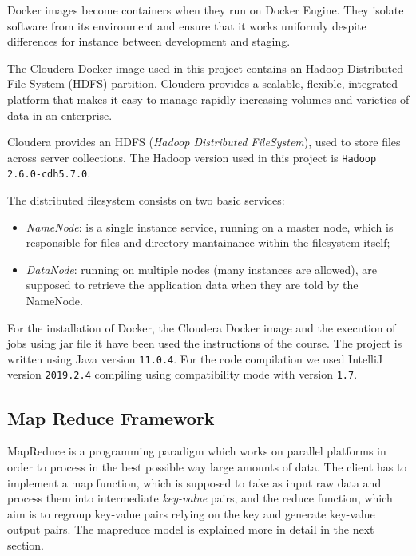\documentclass[a4paper,11pt, twoside, openright]{article}
\begin{document}
		\bigskip

		\noindent
		Docker images become containers when they run on Docker Engine. They isolate software from its environment and ensure that it works uniformly despite differences for instance between development and staging.
		
		\bigskip

		\noindent
		The Cloudera\parencite{Cloudera} Docker image used in this project contains an Hadoop Distributed File System (HDFS) partition. Cloudera provides a scalable, flexible, integrated platform that makes it easy to manage rapidly increasing volumes and varieties of data in an enterprise. 

		\bigskip
		
		\noindent
		Cloudera provides an HDFS (\textit{Hadoop Distributed FileSystem})\parencite{Hadoop-Mapreduce}, used to store files across server collections. The Hadoop version used in this project is \texttt{Hadoop 2.6.0-cdh5.7.0}.
		
		The distributed filesystem consists on two basic services: \begin{itemize}
			\item \textit{NameNode}: is a single instance service, running on a master node, which is responsible for files and directory mantainance within the filesystem itself;
			
			\item \textit{DataNode}: running on multiple nodes (many instances are allowed), are supposed to retrieve the application data when they are told by the NameNode.
		\end{itemize}
	
		\bigskip
		
		\noindent
		For the installation of Docker, the Cloudera Docker image and the execution of jobs using jar file it have been used the instructions of the course. The project is written using Java version \texttt{11.0.4}. For the code compilation we used IntelliJ version \texttt{2019.2.4} compiling using compatibility mode with version \texttt{1.7}.

	\subsection{Map Reduce Framework}
		MapReduce is a programming paradigm which works on parallel platforms in order to process in the best possible way large amounts of data. The client has to implement a map function, which is supposed to take as input raw data and process them into intermediate \textit{key-value} pairs, and the reduce function, which aim is to regroup key-value pairs relying on the key and generate key-value output pairs. The mapreduce model is explained more in detail in the next section.
		
\end{document}
